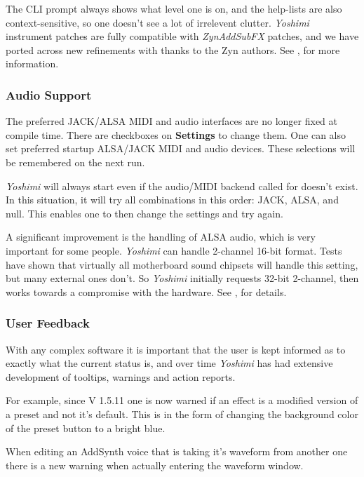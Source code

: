 \documentclass[
 11pt,
 twoside,
 a4paper,
 final                                 %
]{article}
\begin{document}
   The CLI prompt always
   shows what level one is on, and the help-lists are also
   context-sensitive, so one doesn't see a lot of irrelevent clutter.
   \textsl{Yoshimi} instrument patches are fully
   compatible with \textsl{ZynAddSubFX} patches, and we have ported across
   new refinements with thanks to the Zyn authors.
   See , for more information.

\subsubsection{Audio Support}
\label{subsubsec:new_features_audio_support}

   The preferred JACK/ALSA MIDI and audio interfaces are no longer fixed at
   compile time. There are checkboxes on \textbf{Settings} to change them.
   One can also set preferred startup ALSA/JACK MIDI and audio devices.
   These selections will be remembered on the next run.

   \textsl{Yoshimi} will always start even if the audio/MIDI backend called
   for doesn't exist. In this situation, it will try all combinations in this
   order: JACK, ALSA, and null. This enables one to then change the settings
   and try again.

   A significant improvement is the handling of ALSA audio, which is very
   important for some people.  \textsl{Yoshimi} can handle 2-channel 16-bit
   format. Tests have shown that virtually all motherboard sound chipsets will
   handle this setting, but many external ones don't.  So \textsl{Yoshimi}
   initially requests 32-bit 2-channel, then works towards a compromise with the
   hardware.
   See , for details.

\subsubsection{User Feedback}
\label{subsubsec:new_features_user_feedback}
   With any complex software it is important that the user is kept informed
   as to exactly what the current status is, and over time \textsl{Yoshimi}
   has had extensive development of tooltips, warnings and action reports.

   For example, since V 1.5.11 one is now warned if an effect is a modified
   version of a preset and not it's default. This is in the form of changing
   the background color of the preset button to a bright blue.

   When editing an AddSynth voice that is taking it's waveform from another one
   there is a new warning when actually entering the waveform window.
\end{document}
